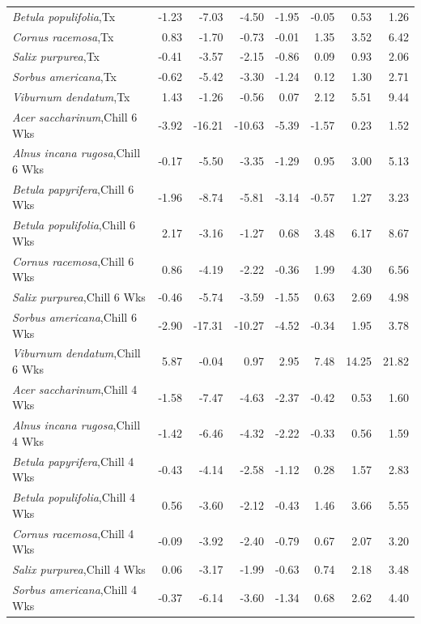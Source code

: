 \documentclass{article}\usepackage[]{graphicx}\usepackage[]{color}
\begin{document}
\begin{longtable}{lrrrrrrr}
  \textit{Betula populifolia},Tx & -1.23 & -7.03 & -4.50 & -1.95 & -0.05 & 0.53 & 1.26 \\ 
  \textit{Cornus racemosa},Tx & 0.83 & -1.70 & -0.73 & -0.01 & 1.35 & 3.52 & 6.42 \\ 
  \textit{Salix purpurea},Tx & -0.41 & -3.57 & -2.15 & -0.86 & 0.09 & 0.93 & 2.06 \\ 
  \textit{Sorbus americana},Tx & -0.62 & -5.42 & -3.30 & -1.24 & 0.12 & 1.30 & 2.71 \\ 
  \textit{Viburnum dendatum},Tx & 1.43 & -1.26 & -0.56 & 0.07 & 2.12 & 5.51 & 9.44 \\ 
  \textit{Acer saccharinum},Chill 6 Wks & -3.92 & -16.21 & -10.63 & -5.39 & -1.57 & 0.23 & 1.52 \\ 
  \textit{Alnus incana rugosa},Chill 6 Wks & -0.17 & -5.50 & -3.35 & -1.29 & 0.95 & 3.00 & 5.13 \\ 
  \textit{Betula papyrifera},Chill 6 Wks & -1.96 & -8.74 & -5.81 & -3.14 & -0.57 & 1.27 & 3.23 \\ 
  \textit{Betula populifolia},Chill 6 Wks & 2.17 & -3.16 & -1.27 & 0.68 & 3.48 & 6.17 & 8.67 \\ 
  \textit{Cornus racemosa},Chill 6 Wks & 0.86 & -4.19 & -2.22 & -0.36 & 1.99 & 4.30 & 6.56 \\ 
  \textit{Salix purpurea},Chill 6 Wks & -0.46 & -5.74 & -3.59 & -1.55 & 0.63 & 2.69 & 4.98 \\ 
  \textit{Sorbus americana},Chill 6 Wks & -2.90 & -17.31 & -10.27 & -4.52 & -0.34 & 1.95 & 3.78 \\ 
  \textit{Viburnum dendatum},Chill 6 Wks & 5.87 & -0.04 & 0.97 & 2.95 & 7.48 & 14.25 & 21.82 \\ 
  \textit{Acer saccharinum},Chill 4 Wks & -1.58 & -7.47 & -4.63 & -2.37 & -0.42 & 0.53 & 1.60 \\ 
  \textit{Alnus incana rugosa},Chill 4 Wks & -1.42 & -6.46 & -4.32 & -2.22 & -0.33 & 0.56 & 1.59 \\ 
  \textit{Betula papyrifera},Chill 4 Wks & -0.43 & -4.14 & -2.58 & -1.12 & 0.28 & 1.57 & 2.83 \\ 
  \textit{Betula populifolia},Chill 4 Wks & 0.56 & -3.60 & -2.12 & -0.43 & 1.46 & 3.66 & 5.55 \\ 
  \textit{Cornus racemosa},Chill 4 Wks & -0.09 & -3.92 & -2.40 & -0.79 & 0.67 & 2.07 & 3.20 \\ 
  \textit{Salix purpurea},Chill 4 Wks & 0.06 & -3.17 & -1.99 & -0.63 & 0.74 & 2.18 & 3.48 \\ 
  \textit{Sorbus americana},Chill 4 Wks & -0.37 & -6.14 & -3.60 & -1.34 & 0.68 & 2.62 & 4.40 \\ 

\end{longtable}
\end{document}
